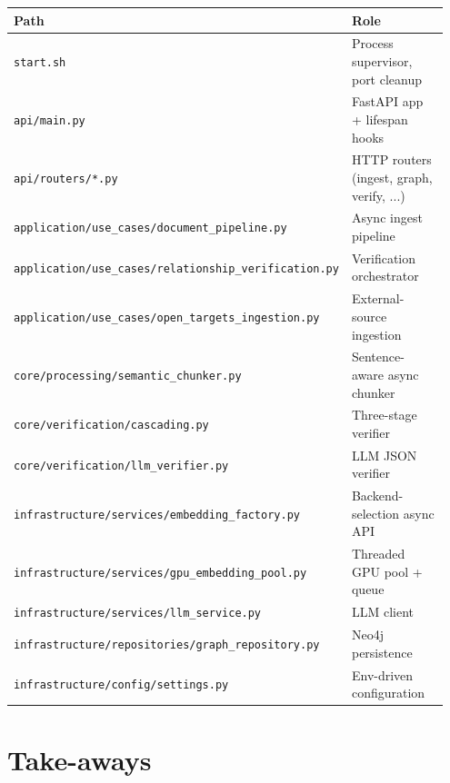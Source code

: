 \documentclass[11pt,a4paper]{article}
\begin{document}
\begin{tabular}{@{}p{0.45\linewidth}p{0.50\linewidth}@{}}
  \toprule
  Path & Role \\
  \midrule
  \texttt{start.sh}                                        & Process supervisor, port cleanup \\
  \texttt{api/main.py}                                     & FastAPI app + lifespan hooks \\
  \texttt{api/routers/*.py}                                & HTTP routers (ingest, graph, verify, ...) \\
  \texttt{application/use\_cases/document\_pipeline.py}    & Async ingest pipeline \\
  \texttt{application/use\_cases/relationship\_verification.py} & Verification orchestrator \\
  \texttt{application/use\_cases/open\_targets\_ingestion.py} & External-source ingestion \\
  \texttt{core/processing/semantic\_chunker.py}            & Sentence-aware async chunker \\
  \texttt{core/verification/cascading.py}                  & Three-stage verifier \\
  \texttt{core/verification/llm\_verifier.py}              & LLM JSON verifier \\
  \texttt{infrastructure/services/embedding\_factory.py}   & Backend-selection async API \\
  \texttt{infrastructure/services/gpu\_embedding\_pool.py} & Threaded GPU pool + queue \\
  \texttt{infrastructure/services/llm\_service.py}         & LLM client \\
  \texttt{infrastructure/repositories/graph\_repository.py}& Neo4j persistence \\
  \texttt{infrastructure/config/settings.py}               & Env-driven configuration \\
  \bottomrule
\end{tabular}

\section{Take-aways}
\end{document}
